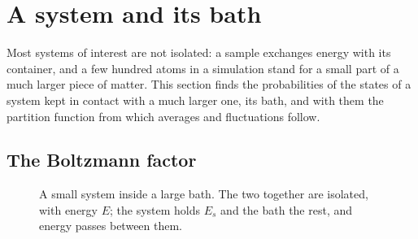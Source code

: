 \section{A system and its bath}
\label{sec:sm-canonical}

Most systems of interest are not isolated: a sample exchanges energy with
its container, and a few hundred atoms in a simulation stand for a small
part of a much larger piece of matter. This section finds the
probabilities of the states of a system kept in contact with a much
larger one, its bath, and with them the partition function from which
averages and fluctuations follow.

\subsection*{The Boltzmann factor}

\begin{figure}[htb]
\centering
{}
\caption{A small system inside a large bath. The two together are
isolated, with energy $E$; the system holds $E_s$ and the bath the rest,
and energy passes between them.}
\label{fig:sm-bath}
\end{figure}

